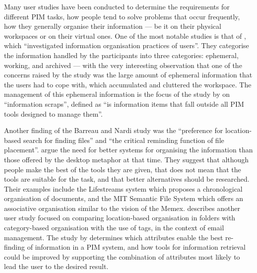 Many user studies have been conducted to determine the requirements for different PIM tasks, how people tend to solve problems that occur frequently, how they generally organise their information --- be it on their physical workspaces or on their virtual ones. One of the most notable studies is that of \cite{Barreau1995a}, which ``investigated information organisation practices of users''. They categorise the information handled by the participants into three categories:  ephemeral, working, and archived --- with the very interesting observation that one of the concerns raised by the study was the large amount of ephemeral information that the users had to cope with, which accumulated and cluttered the workspace. The management of this ephemeral information is the focus of the study by \cite{Bernstein2008} on ``information scraps'', defined as ``is information items that fall outside all PIM tools designed to manage them''.

Another finding of the Barreau and Nardi study was the ``preference for location-based search for finding files'' and ``the critical reminding function of file placement''. 
\cite{Fertig1996a} argue the need for better systems for organising the information than those offered by the desktop metaphor at that time. They suggest that although people make the best of the tools they are given, that does not mean that the tools are suitable for the task, and that better alternatives should be researched. Their examples include the Lifestreams \cite{Freeman1995,Fertig1996b} system which proposes a chronological organisation of documents, and the MIT Semantic File System \cite{Gifford1991} which offers an associative organisation similar to the vision of the Memex. \cite{Civan2008} describes another user study focused on comparing location-based organisation in folders with category-based organisation with the use of tags, in the context of email management. The study by \cite{BlancBrude2007} determines which attributes enable the best re-finding of information in a PIM system, and how tools for information retrieval could be improved by supporting the combination of attributes most 
likely to lead the user to the desired result.

